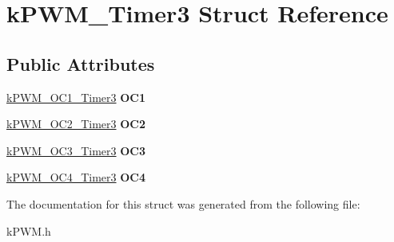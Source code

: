 \hypertarget{structkPWM__Timer3}{}\section{k\+P\+W\+M\+\_\+\+Timer3 Struct Reference}
\label{structkPWM__Timer3}
\subsection*{Public Attributes}
\begin{DoxyCompactItemize}
\item 
\hyperlink{structkPWM__OC1__Timer3}{k\+P\+W\+M\+\_\+\+O\+C1\+\_\+\+Timer3} {\bfseries O\+C1}\hypertarget{structkPWM__Timer3_adc44e191488cea463df43ca7b5ef975c}{}\label{structkPWM__Timer3_adc44e191488cea463df43ca7b5ef975c}

\item 
\hyperlink{structkPWM__OC2__Timer3}{k\+P\+W\+M\+\_\+\+O\+C2\+\_\+\+Timer3} {\bfseries O\+C2}\hypertarget{structkPWM__Timer3_ac9cb2f2d977ee39e6f60395ea67d9c2b}{}\label{structkPWM__Timer3_ac9cb2f2d977ee39e6f60395ea67d9c2b}

\item 
\hyperlink{structkPWM__OC3__Timer3}{k\+P\+W\+M\+\_\+\+O\+C3\+\_\+\+Timer3} {\bfseries O\+C3}\hypertarget{structkPWM__Timer3_a7abed94bd83d89e92c16cea9ab67abed}{}\label{structkPWM__Timer3_a7abed94bd83d89e92c16cea9ab67abed}

\item 
\hyperlink{structkPWM__OC4__Timer3}{k\+P\+W\+M\+\_\+\+O\+C4\+\_\+\+Timer3} {\bfseries O\+C4}\hypertarget{structkPWM__Timer3_ad5b1744001490bada6f315da9903fb6e}{}\label{structkPWM__Timer3_ad5b1744001490bada6f315da9903fb6e}

\end{DoxyCompactItemize}


The documentation for this struct was generated from the following file\+:\begin{DoxyCompactItemize}
\item 
k\+P\+W\+M.\+h\end{DoxyCompactItemize}
